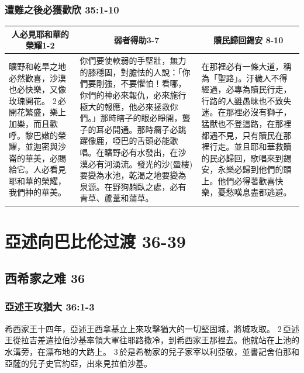\subsubsection{遭難之後必獲歡欣 35:1-10}
\begin{table}[H]
\centering
\begin{tabular}{p{3.75cm}|p{7.50cm}|p{5.750cm}}\hline\hline
\multicolumn{1}{c|}{人必見耶和華的榮耀1-2}&\multicolumn{1}{c|}{弱者得助3-7}&\multicolumn{1}{c}{贖民歸回錫安 8-10}\\\hline
曠野和乾旱之地必然歡喜，沙漠也必快樂，又像玫瑰開花。 2 必開花繁盛，樂上加樂，而且歡呼。黎巴嫩的榮耀，並迦密與沙崙的華美，必賜給它。人必看見耶和華的榮耀，我們神的華美。
&你們要使軟弱的手堅壯，無力的膝穩固，對膽怯的人說：「你們要剛強，不要懼怕！看哪，你們的神必來報仇，必來施行極大的報應，他必來拯救你們。」那時瞎子的眼必睜開，聾子的耳必開通。那時瘸子必跳躍像鹿，啞巴的舌頭必能歌唱。在曠野必有水發出，在沙漠必有河湧流。發光的沙(蜃樓)要變為水池，乾渴之地要變為泉源。在野狗躺臥之處，必有青草、蘆葦和蒲草。
&在那裡必有一條大道，稱為「聖路」。汙穢人不得經過，必專為贖民行走，行路的人雖愚昧也不致失迷。在那裡必沒有獅子，猛獸也不登這路，在那裡都遇不見，只有贖民在那裡行走。並且耶和華救贖的民必歸回，歌唱來到錫安，永樂必歸到他們的頭上。他們必得著歡喜快樂，憂愁嘆息盡都逃避。\\\hline
\end{tabular}
\end{table}



\section{亞述向巴比伦过渡 36-39}
\subsection{西希家之难 36}
\subsubsection{亞述王攻猶大 36:1-3}
希西家王十四年，亞述王西拿基立上來攻擊猶大的一切堅固城，將城攻取。 2 亞述王從拉吉差遣拉伯沙基率領大軍往耶路撒冷，到希西家王那裡去。他就站在上池的水溝旁，在漂布地的大路上。 3 於是希勒家的兒子家宰以利亞敬，並書記舍伯那和亞薩的兒子史官約亞，出來見拉伯沙基。

